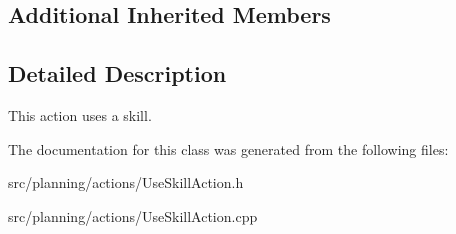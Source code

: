 \subsection*{Additional Inherited Members}


\subsection{Detailed Description}
This action uses a skill. 

The documentation for this class was generated from the following files\+:\begin{DoxyCompactItemize}
\item 
src/planning/actions/Use\+Skill\+Action.\+h\item 
src/planning/actions/Use\+Skill\+Action.\+cpp\end{DoxyCompactItemize}
